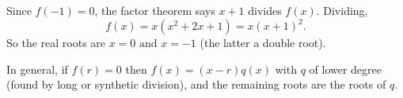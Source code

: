 Since \(f(-1)=0\), the factor theorem says \(x+1\) divides \(f(x)\). Dividing,
\[
f(x)=x(x^2+2x+1)=x(x+1)^2 .
\]
So the real roots are \(\boxed{x=0\text{ and }x=-1}\) (the latter a double root).

In general, if \(f(r)=0\) then \(f(x)=(x-r)q(x)\) with \(q\) of lower degree (found by long or synthetic division), and the remaining roots are the roots of \(q\).
